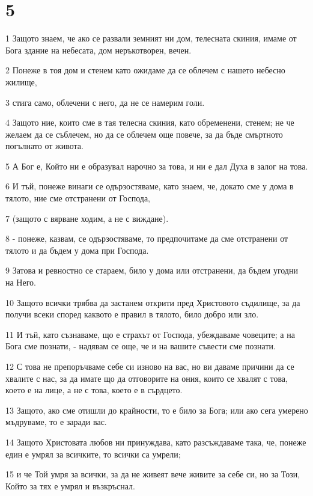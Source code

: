 \chapter{5}

\par 1 Защото знаем, че ако се развали земният ни дом, телесната скиния, имаме от Бога здание на небесата, дом неръкотворен, вечен.
\par 2 Понеже в тоя дом и стенем като ожидаме да се облечем с нашето небесно жилище,
\par 3 стига само, облечени с него, да не се намерим голи.
\par 4 Защото ние, които сме в тая телесна скиния, като обременени, стенем; не че желаем да се съблечем, но да се облечем още повече, за да бъде смъртното погълнато от живота.
\par 5 А Бог е, Който ни е образувал нарочно за това, и ни е дал Духа в залог на това.
\par 6 И тъй, понеже винаги се одързостяваме, като знаем, че, докато сме у дома в тялото, ние сме отстранени от Господа,
\par 7 (защото с вярване ходим, а не с виждане).
\par 8 - понеже, казвам, се одързостяваме, то предпочитаме да сме отстранени от тялото и да бъдем у дома при Господа.
\par 9 Затова и ревностно се стараем, било у дома или отстранени, да бъдем угодни на Него.
\par 10 Защото всички трябва да застанем открити пред Христовото съдилище, за да получи всеки според каквото е правил в тялото, било добро или зло.
\par 11 И тъй, като съзнаваме, що е страхът от Господа, убеждаваме човеците; а на Бога сме познати, - надявам се още, че и на вашите съвести сме познати.
\par 12 С това не препоръчваме себе си изново на вас, но ви даваме причини да се хвалите с нас, за да имате що да отговорите на ония, които се хвалят с това, което е на лице, а не с това, което е в сърдцето.
\par 13 Защото, ако сме отишли до крайности, то е било за Бога; или ако сега умерено мъдруваме, то е заради вас.
\par 14 Защото Христовата любов ни принуждава, като разсъждаваме така, че, понеже един е умрял за всичките, то всички са умрели;
\par 15 и че Той умря за всички, за да не живеят вече живите за себе си, но за Този, Който за тях е умрял и възкръснал.
